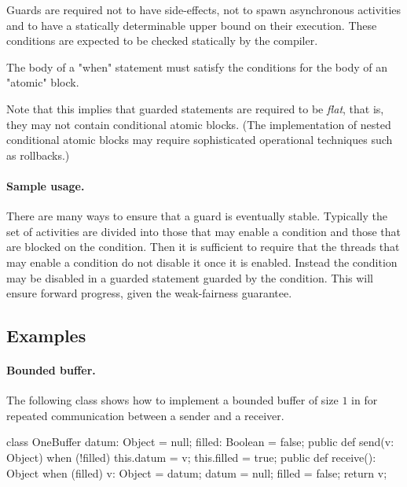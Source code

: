{Guards are required not to have side-effects, not to spawn
asynchronous activities and to have a statically determinable upper
bound on their execution. These conditions are expected to be checked
statically by the compiler.

The body of a \xcd"when" statement must satisfy the conditions
for the body of an \xcd"atomic" block.

Note that this implies that guarded statements are required to be {\em
flat}, that is, they may not contain conditional atomic blocks. (The
implementation of nested conditional atomic blocks may require
sophisticated operational techniques such as rollbacks.)

\paragraph{Sample usage.} 
There are many ways to ensure that a guard is eventually
stable. Typically the set of activities are divided into those that
may enable a condition and those that are blocked on the
condition. Then it is sufficient to require that the threads that may
enable a condition do not disable it once it is enabled. Instead the
condition may be disabled in a guarded statement guarded by the
condition. This will ensure forward progress, given the weak-fairness
guarantee.

\subsection{Examples}

\paragraph{Bounded buffer.}
The following class shows how to implement a bounded buffer of size
$1$ in \Xten{} for repeated communication between a sender and a
receiver.

\begin{xten}
class OneBuffer {
  datum: Object = null;
  filled: Boolean = false;
  public def send(v: Object) {
    when (!filled) {
      this.datum = v;
      this.filled = true;
    }
  }
  public def receive(): Object {
    when (filled) {
      v: Object = datum;
      datum = null;
      filled = false;
      return v;
    }
  }
}
\end{xten}

}
